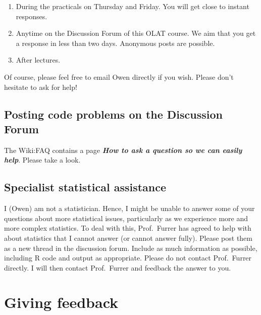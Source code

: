 \documentclass[
  letterpaper,
  8pt,
  a4paper]{book}
\providecommand{\tightlist}{%
  \setlength{\itemsep}{0pt}\setlength{\parskip}{0pt}}
\begin{document}
\begin{enumerate}
\def\labelenumi{\arabic{enumi}.}
\tightlist
\item
  During the practicals on Thursday and Friday. You will get close to
  instant responses.
\item
  Anytime on the Discussion Forum of this OLAT course. We aim that you
  get a response in less than two days. Anonymous posts are possible.
\item
  After lectures.
\end{enumerate}

Of course, please feel free to email Owen directly if you wish. Please
don't hesitate to ask for help!

\subsection*{Posting code problems on the Discussion
Forum}\label{posting-code-problems-on-the-discussion-forum}

The Wiki:FAQ contains a page \textbf{\emph{How to ask a question so we
can easily help}}. Please take a look.

\subsection*{Specialist statistical
assistance}\label{specialist-statistical-assistance}

I (Owen) am not a statistician. Hence, I might be unable to answer some
of your questions about more statistical issues, particularly as we
experience more and more complex statistics. To deal with this,
Prof.~Furrer has agreed to help with about statistics that I cannot
answer (or cannot answer fully). Please post them as a new thread in the
discussion forum. Include as much information as possible, including R
code and output as appropriate. Please do not contact Prof.~Furrer
directly. I will then contact Prof.~Furrer and feedback the answer to
you.

\section*{Giving feedback}\label{giving-feedback}

\end{document}
